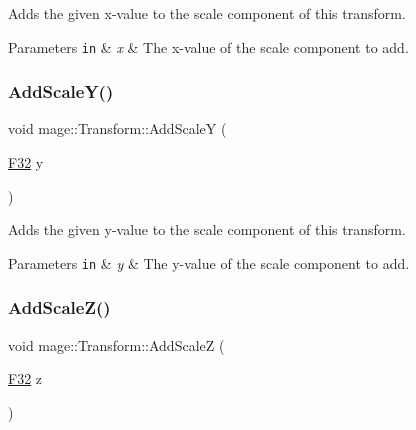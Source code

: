 Adds the given x-\/value to the scale component of this transform.


\begin{DoxyParams}[1]{Parameters}
\mbox{\tt in}  & {\em x} & The x-\/value of the scale component to add. \\
\hline
\end{DoxyParams}
\hypertarget{structmage_1_1_transform_a6f3dbff67c49f2d920c25d46cf25d0ee}{}\label{structmage_1_1_transform_a6f3dbff67c49f2d920c25d46cf25d0ee} 
\subsubsection{\texorpdfstring{Add\+Scale\+Y()}{AddScaleY()}}
{\footnotesize\ttfamily void mage\+::\+Transform\+::\+Add\+ScaleY (\begin{DoxyParamCaption}\item[{\hyperlink{namespacemage_aa97e833b45f06d60a0a9c4fc22ae02c0}{F32}}]{y }\end{DoxyParamCaption})\hspace{0.3cm}{\ttfamily [noexcept]}}

Adds the given y-\/value to the scale component of this transform.


\begin{DoxyParams}[1]{Parameters}
\mbox{\tt in}  & {\em y} & The y-\/value of the scale component to add. \\
\hline
\end{DoxyParams}
\hypertarget{structmage_1_1_transform_ae9aa81d2f6af6422a261878b63a0e5de}{}\label{structmage_1_1_transform_ae9aa81d2f6af6422a261878b63a0e5de} 
\subsubsection{\texorpdfstring{Add\+Scale\+Z()}{AddScaleZ()}}
{\footnotesize\ttfamily void mage\+::\+Transform\+::\+Add\+ScaleZ (\begin{DoxyParamCaption}\item[{\hyperlink{namespacemage_aa97e833b45f06d60a0a9c4fc22ae02c0}{F32}}]{z }\end{DoxyParamCaption})\hspace{0.3cm}{\ttfamily [noexcept]}}


